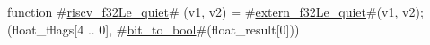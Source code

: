 function #\hyperref[sailRISCVzriscvzyf32Lezyquiet]{riscv\_f32Le\_quiet}# (v1, v2) = {
  #\hyperref[sailRISCVzexternzyf32Lezyquiet]{extern\_f32Le\_quiet}#(v1, v2);
  (float_fflags[4 .. 0], #\hyperref[sailRISCVzbitzytozybool]{bit\_to\_bool}#(float_result[0]))
}
